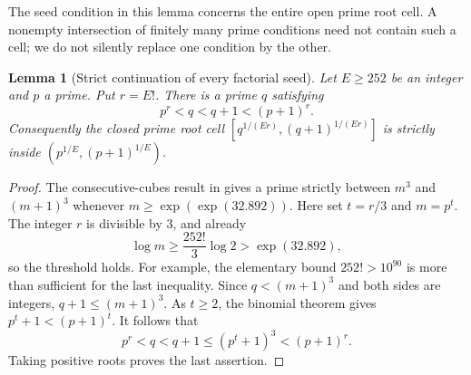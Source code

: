 \documentclass[11pt,a4paper]{article}
\newtheorem{lemma}[theorem]{Lemma}
\theoremstyle{definition}
\theoremstyle{remark}
\numberwithin{equation}{section}
\begin{document}
The seed condition in this lemma concerns the entire open prime root
cell.  A nonempty intersection of finitely many prime conditions need not
contain such a cell; we do not silently replace one condition by the
other.

\begin{lemma}[Strict continuation of every factorial seed]
\label{fol:dim:factorial-continuation}
Let $E\ge252$ be an integer and $p$ a prime.  Put $r=E!$.  There is a prime
$q$ satisfying
\[
 p^r<q<q+1<(p+1)^r.
\]
Consequently the closed prime root cell
$[q^{1/(Er)},(q+1)^{1/(Er)}]$ is strictly inside
$(p^{1/E},(p+1)^{1/E})$.
\end{lemma}
\begin{proof}
The consecutive-cubes result in \cite[Section~4]{CullyHugill2023} gives a
prime strictly between $m^3$ and $(m+1)^3$ whenever
$m\ge\exp(\exp(32.892))$.  Here set $t=r/3$ and $m=p^t$.
The integer $r$ is divisible by $3$, and already
\[
 \log m\ge\frac{252!}{3}\log2>\exp(32.892),
\]
so the threshold holds.  For example, the elementary bound
$252!>10^{90}$ is more than sufficient for the last inequality.
Since $q<(m+1)^3$ and both sides are integers,
$q+1\le(m+1)^3$.  As $t\ge2$, the binomial theorem gives
$p^t+1<(p+1)^t$.  It follows that
\[
 p^r<q<q+1\le(p^t+1)^3<(p+1)^r.
\]
Taking positive roots proves the last assertion.
\end{proof}
\end{document}
